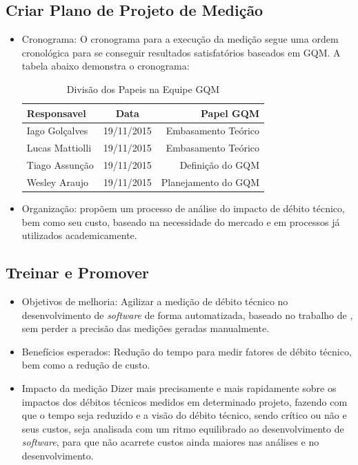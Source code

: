 \subsection{Criar Plano de Projeto de Medição}
\begin{itemize}
  \item Cronograma: O cronograma para a execução da medição segue uma ordem cronológica
  para se conseguir resultados satisfatórios baseados em GQM. A tabela abaixo demonstra
  o cronograma:

  \begin{table}[ht]
  \caption{Divisão dos Papeis na Equipe GQM}
  \centering
  \begin{tabular}{|l*{1}{c}r|}
  \hline
  Responsavel              & Data & Papel GQM \\
  \hline
  Iago Golçalves & 19/11/2015 &   Embasamento Teórico   \\
  \hline
  Lucas Mattiolli & 19/11/2015 &   Embasamento Teórico \\
  \hline
  Tiago Assunção & 19/11/2015 &   Definição do GQM  \\
  \hline
  Wesley Araujo & 19/11/2015 &   Planejamento do GQM \\
  \hline
  \end{tabular}
  \label{table:papeisgqm}
  \end{table}

\item Organização: \cite{td} propõem um processo de análise do impacto de débito técnico,
bem como seu custo, baseado na necessidade do mercado e em processos já utilizados academicamente.
\end{itemize}

\subsection{Treinar e Promover}
\begin{itemize}
\item Objetivos de melhoria: Agilizar a medição de débito técnico no desenvolvimento de \textit{software} de forma
automatizada, baseado no trabalho de \cite{td}, sem perder a precisão das medições geradas manualmente.

\item Benefícios esperados: \cite{td} Redução do tempo para medir fatores de débito técnico, bem como a
redução de custo.

\item Impacto da medição \cite{td} Dizer mais precisamente e mais rapidamente sobre os impactos dos débitos
técnicos medidos em determinado projeto, fazendo com que o tempo seja reduzido e a visão do débito técnico, sendo
crítico ou não e seus custos, seja analisada com um ritmo equilibrado ao desenvolvimento de \textit{software}, para que não acarrete
custos ainda maiores nas análises e no desenvolvimento.

\end{itemize}
